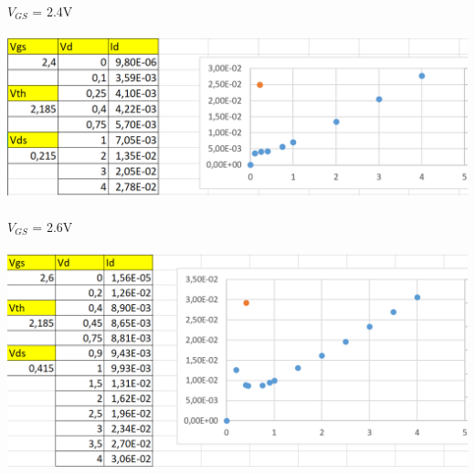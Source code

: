 \documentclass{article}
\begin{document}
\begin{enumerate}
				\(V_{GS} \) = 2.4V\\\\
				\includegraphics[scale=0.5]{graph 4}\\\\
				\(V_{GS} \) = 2.6V \\\\
				\includegraphics[scale=0.5]{graph 5}\\\\
				
				
			\end{enumerate}	
			
			
\end{document}
